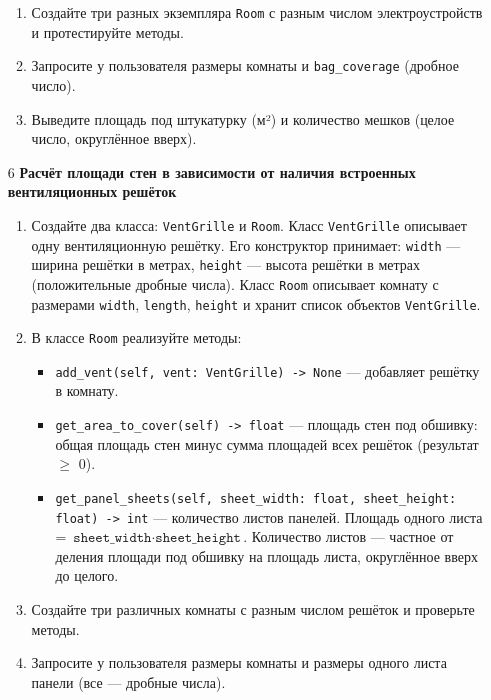 \begin{enumerate}
\begin{enumerate}
    \item Создайте три разных экземпляра \texttt{Room} с разным числом электроустройств и протестируйте методы.

    \item Запросите у пользователя размеры комнаты и \texttt{bag\_coverage} (дробное число).

    \item Выведите площадь под штукатурку (м²) и количество мешков (целое число, округлённое вверх).
\end{enumerate}

\item[6] \textbf{Расчёт площади стен в зависимости от наличия встроенных вентиляционных решёток}
\begin{enumerate}
    \item Создайте два класса: \texttt{VentGrille} и \texttt{Room}.  
    Класс \texttt{VentGrille} описывает одну вентиляционную решётку. Его конструктор принимает:  
    \texttt{width} — ширина решётки в метрах,  
    \texttt{height} — высота решётки в метрах (положительные дробные числа).  
    Класс \texttt{Room} описывает комнату с размерами \texttt{width}, \texttt{length}, \texttt{height} и хранит список объектов \texttt{VentGrille}.

    \item В классе \texttt{Room} реализуйте методы:  
    \begin{itemize}
        \item \texttt{add\_vent(self, vent: VentGrille) -> None} — добавляет решётку в комнату.
        \item \texttt{get\_area\_to\_cover(self) -> float} — площадь стен под обшивку: общая площадь стен минус сумма площадей всех решёток (результат $\geqslant$ 0).
        \item \texttt{get\_panel\_sheets(self, sheet\_width: float, sheet\_height: float) -> int} — количество листов панелей. Площадь одного листа = \(\texttt{sheet\_width} \cdot \texttt{sheet\_height}\). Количество листов — частное от деления площади под обшивку на площадь листа, округлённое вверх до целого.
    \end{itemize}

    \item Создайте три различных комнаты с разным числом решёток и проверьте методы.

    \item Запросите у пользователя размеры комнаты и размеры одного листа панели (все — дробные числа).


\end{enumerate}
\end{enumerate}
